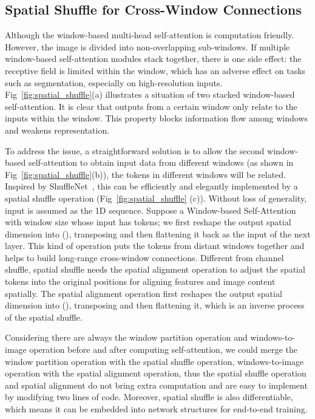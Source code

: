 \documentclass{article}
\begin{document}
\subsection{Spatial Shuffle for Cross-Window Connections} \label{Spatial_Shuffle}


Although the window-based multi-head self-attention is computation friendly. However, the image is divided into non-overlapping sub-windows. If multiple window-based self-attention modules stack together, there is one side effect: the receptive field is limited within the window, which has an adverse effect on tasks such as segmentation, especially on high-resolution inputs. Fig~\ref{fig:spatial_shuffle}(a) illustrates a situation of two stacked window-based self-attention. It is clear that outputs from a certain window only relate to the inputs within the window. This property blocks information flow among windows and weakens representation.

To address the issue, a straightforward solution is to allow the second window-based self-attention to obtain input data from different windows (as shown in Fig~\ref{fig:spatial_shuffle}(b)), the tokens in different windows will be related. Inspired by ShuffleNet~\cite{zhang2018shufflenet}, this can be efficiently and elegantly implemented by a spatial shuffle operation (Fig~\ref{fig:spatial_shuffle} (c)). Without loss of generality, input is assumed as the 1D sequence. Suppose a Window-based Self-Attention with window size  whose input has  tokens; we first reshape the output spatial dimension into (), transposing and then flattening it back as the input of the next layer. 
This kind of operation puts the tokens from distant windows together and helps to build long-range cross-window connections. Different from channel shuffle, spatial shuffle needs the spatial alignment operation to adjust the spatial tokens into the original positions for aligning features and image content spatially. The spatial alignment operation first reshapes the output spatial dimension into (), transposing and then flattening it, which is an inverse process of the spatial shuffle. 

Considering there are always the window partition operation and windows-to-image operation before and after computing self-attention, we could merge the window partition operation with the spatial shuffle operation, windows-to-image operation with the spatial alignment operation, thus the spatial shuffle operation and spatial alignment do not bring extra computation and are easy to implement by modifying two lines of code.  Moreover, spatial shuffle is also differentiable, which means it can be embedded into network structures for end-to-end training. 
\end{document}
